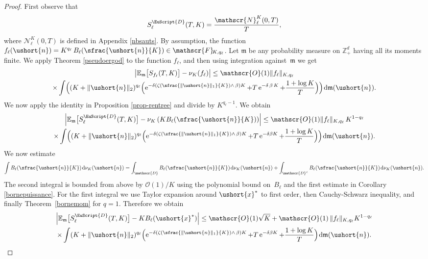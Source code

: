 \documentclass[JEP,XML,SOM,Unicode]{cedram}
\newcommand{\Psfrac}[2]{(\sfrac{#1}{#2})}
\let\mathcal\mathscr
\numberwithin{equation}{section}
\theoremstyle{plain}
\theoremstyle{definition}
\newcommand{\E}{{\mathbb{E}}}
\newcommand{\zentiers}{{\mathbb{Z}}}
\newcommand{\domaine}{\zentiers_{+}^{d}}
\newcommand{\Oun}{\mathcal{O}(1)}
\newcommand{\sK}{K}
\newcommand{\vecn}{\ushort{n}}
\newcommand{\vecxf}{\ushort{x}^*}
\newcommand{\nuk}{\nu_{K}}\let\snuk\nuk
\newcommand{\e}{\operatorname{e}}
\newcommand{\dd}{\hspace{1pt}\mathrm{d}}
\newcommand{\normdeux}[1]{\|#1\|_{2}}\let\snormdeux\normdeux
\begin{document}
\begin{proof}
First observe that
\[
S^{{ \EuScript{D}}}_{\ell}(T,K)=\frac{\mathcal{N}^{\sK}_\ell(0,T)}{T},
\]
where $\mathcal{N}^{\sK}_\ell(0,T)$ is defined in Appendix \ref{nbsauts}.
By assumption, the function $f_\ell(\vecn)=K^{q_\ell}\, B_\ell(\sfrac{\vecn}{K}) \in \mathscr{F}\!_{\sK,q_\ell}$.
Let $\mathfrak{m}$ be any probability measure on $\domaine$ having all its moments finite. We apply Theorem \ref{pseudoergod} to the function $f_\ell$, and then using integration against~$\mathfrak{m}$ we get
\begin{multline*}
\left| \E_{\mathfrak{m}}\bigl[S_{f_\ell}(T,K)\bigr] - \nuk(f_\ell)\right|
\leq \Oun \|f_\ell\|_{\sK,q_\ell}\\
\times\int \Bigl((K+\normdeux{\vecn})^{q_\ell}
\Bigl(\e^{-\delta\left(\zeta\Psfrac{\|\vecn\|_{1}}{K}\wedge\,\beta\right) K}
+T\e^{-\delta\,\beta\,K}+\frac{1+\log K}{T}\Bigr)\Bigr) \dd \mathfrak{m}(\vecn).
\end{multline*}
We now apply the identity in Proposition \ref{prop-rentree} and divide by $K^{q_\ell -1}$. We obtain
\begin{multline}
\label{boborne}
\left| \E_{\mathfrak{m}}\bigl[S^{{\EuScript{D}}}_{\ell}(T,K)\bigr] - \nuk\left(K B_\ell(\sfrac{\vecn}{K})\right) \right|
\leq \Oun\|f_\ell\|_{\sK,q_\ell}\, K^{1-q_\ell}\\
\times \int \Bigl((K+\normdeux{\vecn})^{q_\ell} \Bigl(\e^{-\delta\left(\zeta\Psfrac{\|\vecn\|_{1}}{K}\wedge\,\beta\right)K}+T\e^{-\delta \beta K}+\frac{1+\log K}{T}\Bigr)\Bigr) \dd\mathfrak{m}(\vecn).
\end{multline}
We now estimate
\[
\int B_\ell(\sfrac{\vecn}{K})\dd \nuk(\vecn)= \int_{\mathcal{D}} B_\ell(\sfrac{\vecn}{K}) \dd \nuk(\vecn)+
\int_{\mathcal{D}^c} B_\ell(\sfrac{\vecn}{K}) \dd \nuk(\vecn).
\]
The second integral is bounded from above by $\Oun/K$ using the polynomial bound on~$B_\ell$ and the first estimate in Corollary \ref{bornepuissance}.
For the first integral we use Taylor expansion around $\vecxf$ to first order, then Cauchy-Schwarz inequality, and finally Theorem~\ref{bornemom} for $q=1$. Therefore we obtain
\begin{multline}
\label{pasbeau}
\left|
\E_{\mathfrak{m}}\bigl[S^{{ \EuScript{D}}}_{\ell}(T,K)\bigr] - K B_\ell(\vecxf)\right|
\leq
\Oun \sqrt{K} +\Oun\, \|f_\ell\|_{\sK,q_\ell} K^{1-q_\ell}\\
\times \int (K+\normdeux{\vecn})^{q_\ell} \Bigl(\e^{-\delta\left(\zeta\Psfrac{\|\vecn\|_{1}}{K}\wedge\,\beta\right)K}
+T\e^{-\delta\beta K}+\frac{1+\log K}{T}\Bigr) \dd\mathfrak{m}(\vecn).

\end{multline}
\end{proof}
\end{document}

